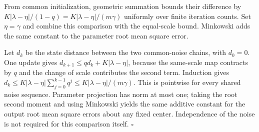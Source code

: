 \documentclass[11pt,a4paper]{article}
\begin{document}
From common initialization, geometric summation bounds their difference by \(K|\lambda-\eta|/(1-q)=K|\lambda-\eta|/(m\gamma)\) uniformly over finite iteration counts. Set \(\eta=\gamma\) and combine this comparison with the equal-scale bound. Minkowski adds the same constant to the parameter root mean square error.




Let \(d_k\) be the state distance between the two common-noise chains, with \(d_0=0\). One update gives \(d_{k+1}\le qd_k+K|\lambda-\eta|\), because the same-scale map contracts by \(q\) and the change of scale contributes the second term. Induction gives \(d_k\le K|\lambda-\eta|\sum_{j=0}^{k-1}q^j\le K|\lambda-\eta|/(m\gamma)\). This is pointwise for every shared noise sequence. Parameter projection has norm at most one; taking the root second moment and using Minkowski yields the same additive constant for the output root mean square errors about any fixed center. Independence of the noise is not required for this comparison itself. \(\square\)
\end{document}
